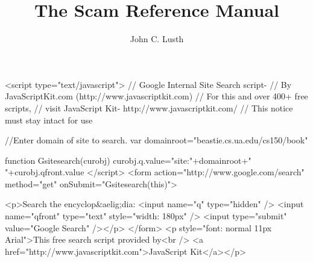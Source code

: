 \documentclass{book}
\title{The Scam Reference Manual}
\author{John C. Lusth}
\begin{document}
\maketitle

\W\htmlrule
\W{}
\W\htmlrule

\begin{rawxml}
<script
    type="text/javascript">
    // Google Internal Site Search script-
    // By JavaScriptKit.com (http://www.javascriptkit.com)
    // For this and over 400+ free scripts,
    // visit JavaScript Kit- http://www.javascriptkit.com/
    // This notice must stay intact for use

    //Enter domain of site to search.
    var domainroot="beastie.cs.ua.edu/cs150/book"

    function Gsitesearch(curobj)
        {
        curobj.q.value="site:"+domainroot+" "+curobj.qfront.value
        }
    </script>
<form
    action="http://www.google.com/search"
    method="get" onSubmit="Gsitesearch(this)">

    <p>Search the encyclop&aelig;dia: 
    <input name="q" type="hidden" />
    <input name="qfront" type="text" style="width: 180px" />
    <input type="submit" value="Google Search" /></p>
    </form>
<p style="font: normal 11px Arial">This free search script provided by<br />
<a href="http://www.javascriptkit.com">JavaScript Kit</a></p>

\end{rawxml}

%


\tableofcontents
\setcounter{tocdepth}{2} 




















%
%
%
%
\end{document}
